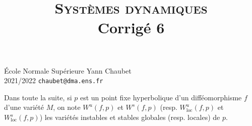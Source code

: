 \documentclass[a4paper,12pt,openany]{article}
\title{\textsc{Syst\`emes dynamiques} \\Corrig\'e 6}
\date{}
\author{}
\theoremstyle{plain}
\theoremstyle{definition}
\begin{document}
{\noindent \'Ecole Normale Sup\'erieure  \hfill Yann Chaubet } \\
{2021/2022 \hfill \texttt{chaubet@dma.ens.fr}}

{\let\newpage\relax\maketitle}
\maketitle

\noindent Dans toute la suite, si $p$ est un point fixe hyperbolique d'un diff\'eomorphisme $f$ d'une vari\'et\'e $M$, on note $W^u(f,p)$ et $W^s(f,p)$ (resp. $W^u_\mathrm{loc}(f,p)$ et $W^s_\mathrm{loc}(f,p)$) les vari\'et\'es instables et stables globales (resp. locales) de $p$.

\vspace{0.6cm}

 \vspace{1.5mm} 
\end{document}
